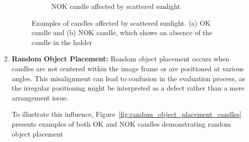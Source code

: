 \documentclass[12pt,DIV14,BCOR12mm,a4paper,footinclude=false,headinclude,parskip=half-,twoside,openright,cleardoublepage=empty,toc=index,bibliography=totoc,listof=totoc]{scrreprt}
\numberwithin{equation}{chapter}
\begin{document}
\begin{enumerate}
\begin{figure}
\begin{subfigure}[b]{0.45\textwidth}
            \caption{NOK candle affected by scattered sunlight}
        \end{subfigure}
        \caption{Examples of candles affected by scattered sunlight. (a) OK candle and (b) NOK candle, which shows an absence of the candle in the holder}
        \label{fig:scattered_sunlight}
    \end{figure}
	\item \textbf{Random Object Placement:} Random object placement occurs when candles are not centered within the image frame or are positioned at various angles. This misalignment can lead to confusion in the evaluation process, as the irregular positioning might be interpreted as a defect rather than a mere arrangement issue.
	
	To illustrate this influence, Figure~\ref{fig:random_object_placement_candles} presents examples of both OK and NOK candles demonstrating random object placement
	

\end{enumerate}
\end{document}
